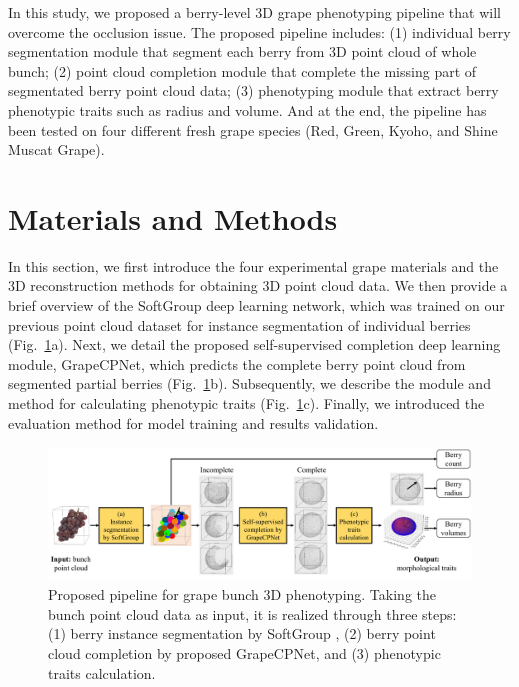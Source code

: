 \documentclass[12pt]{article}
\begin{document}
In this study, we proposed a berry-level 3D grape phenotyping pipeline that will overcome the occlusion issue. 
The proposed pipeline includes: 
(1) individual berry segmentation module that segment each berry from 3D point cloud of whole bunch; 
(2) point cloud completion module that complete the missing part of segmentated berry point cloud data; 
(3) phenotyping module that extract berry phenotypic traits such as radius and volume. 
And at the end, the pipeline has been tested on four different fresh grape species (Red, Green, Kyoho, and Shine Muscat Grape).

\section{Materials and Methods}

In this section, we first introduce the four experimental grape materials and the 3D reconstruction methods for obtaining 3D point cloud data. 
We then provide a brief overview of the SoftGroup \citep{vu_softgroup_2022} deep learning network, which was trained on our previous point cloud dataset for instance segmentation of individual berries (Fig.~\ref{fig:raw1}a). 
Next, we detail the proposed self-supervised completion deep learning module, GrapeCPNet, which predicts the complete berry point cloud from segmented partial berries (Fig.~\ref{fig:raw1}b). 
Subsequently, we describe the module and method for calculating phenotypic traits (Fig.~\ref{fig:raw1}c). 
Finally, we introduced the evaluation method for model training and results validation.

\begin{figure}[hbt!]
    \centering
    \includegraphics[width=1\textwidth]{figures/Figure1.pdf}
    \caption{Proposed pipeline for grape bunch 3D phenotyping. Taking the bunch point cloud data as input, it is realized through three steps: (1) berry instance segmentation by SoftGroup \citep{vu_softgroup_2022}, (2) berry point cloud completion by proposed GrapeCPNet, and (3) phenotypic traits calculation.}
    \label{fig:raw1}
\end{figure}
\end{document}
